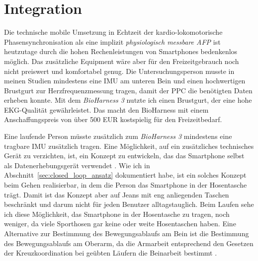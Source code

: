 \section{Integration} 

\label{sec:integration}

Die technische mobile Umsetzung in Echtzeit der kardio-lokomotorische Phasensynchronisation als eine implizit \emph{physiologisch messbare \ac{AFP}} ist heutzutage durch die hohen Rechenleistungen von Smartphones bedenkenlos möglich. Das zusätzliche Equipment wäre aber für den Freizeitgebrauch noch nicht preiswert und komfortabel genug. Die Untersuchungsperson musste in meinen Studien mindestens eine \ac{IMU} am unteren Bein und einen hochwertigen Brustgurt zur Herzfrequenzmessung tragen, damit der \ac{PPC} die benötigten Daten erheben konnte. Mit dem \emph{BioHarness 3} nutzte ich einen Brustgurt, der eine hohe \ac{EKG}-Qualität gewährleistet. Das macht den BioHarness mit einem Anschaffungspreis von über 500 EUR kostspielig für den Freizeitbedarf. 

Eine laufende Person müsste zusätzlich zum \emph{BioHarness 3} mindestens eine tragbare \ac{IMU} zusätzlich tragen. Eine Möglichkeit, auf ein zusätzliches technisches Gerät zu verzichten, ist, ein Konzept zu entwickeln, das das Smartphone selbst als Datenerhebungsgerät verwendet \citep{Strohrmann2013, Strohrmann2014}. Wie ich in Abschnitt~\ref{sec:closed_loop_ansatz} dokumentiert habe, ist ein solches Konzept beim Gehen realisierbar, in dem die Person das Smartphone in der Hosentasche trägt. Damit ist das Konzept aber auf Jeans mit eng anliegenden Taschen beschränkt und darum nicht für jeden Benutzer alltagstauglich. Beim Laufen sehe ich diese Möglichkeit, das Smartphone in der Hosentasche zu tragen, noch weniger, da viele Sporthosen gar keine oder weite Hosentaschen haben. Eine Alternative zur Bestimmung des Bewegungsablaufs am Bein ist die Bestimmung des Bewegungsablaufs am Oberarm, da die Armarbeit entsprechend den Gesetzen der Kreuzkoordination bei geübten Läufern die Beinarbeit bestimmt \citep[][S.~70]{Marquardt2011}.

